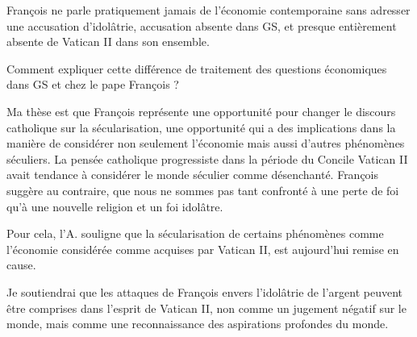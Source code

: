  
François ne parle pratiquement jamais de l’économie contemporaine sans adresser une accusation d’idolâtrie, accusation absente dans GS, et presque entièrement absente de Vatican II dans son ensemble.

Comment expliquer cette différence de traitement des questions économiques dans GS et chez le pape François ?

 
\begin{singlequote}
    Ma thèse est que François représente une opportunité pour changer le discours catholique sur la sécularisation, une opportunité qui a des implications dans la manière de considérer non seulement l'économie mais aussi d'autres phénomènes séculiers. 
    La pensée catholique progressiste dans la période du Concile Vatican II avait tendance à considérer le monde séculier comme désenchanté. François suggère au contraire, que nous ne sommes pas tant confronté à une perte de foi qu’à une nouvelle religion et un foi idolâtre. 
    \cite[p. 126]{cavanaugh_idolatrie_2022}
\end{singlequote}
Pour cela, l'A. souligne que la sécularisation de certains phénomènes comme l'économie considérée comme acquises par Vatican II, est aujourd'hui remise en cause. 
\begin{singlequote}
    Je soutiendrai que les attaques de François envers l'idolâtrie de l'argent peuvent être comprises dans l'esprit de Vatican II, non comme un jugement négatif sur le monde, mais comme une reconnaissance des aspirations profondes du monde. \cite[p. 127]{cavanaugh_idolatrie_2022}
\end{singlequote}


